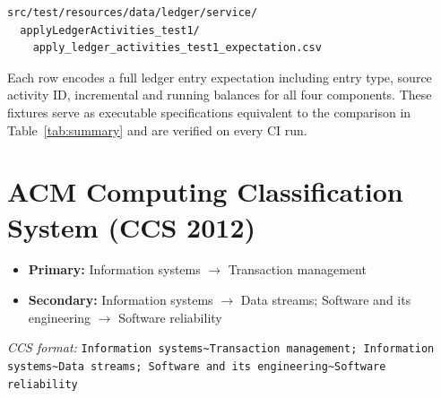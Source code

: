 \documentclass[11pt,letterpaper]{article}
\begin{document}
\begin{lstlisting}
src/test/resources/data/ledger/service/
  applyLedgerActivities_test1/
    apply_ledger_activities_test1_expectation.csv
\end{lstlisting}

Each row encodes a full ledger entry expectation including entry type,
source activity ID, incremental and running balances for all four
components. These fixtures serve as executable specifications equivalent
to the comparison in Table~\ref{tab:summary} and are verified on every
CI run.

\section{ACM Computing Classification System (CCS 2012)}
\label{app:ccs}

\begin{itemize}
  \item \textbf{Primary:} Information systems $\to$ Transaction management
  \item \textbf{Secondary:} Information systems $\to$ Data streams;
        Software and its engineering $\to$ Software reliability
\end{itemize}

\noindent\textit{CCS format:}
\texttt{Information systems\textasciitilde Transaction management;
Information systems\textasciitilde Data streams;
Software and its engineering\textasciitilde Software reliability}
\end{document}
